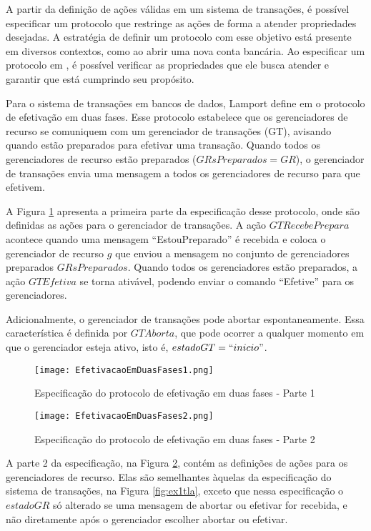 A partir da definição de ações válidas em um sistema de transações, é possível
especificar um protocolo que restringe as ações de forma a atender propriedades
desejadas. A estratégia de definir um protocolo com esse objetivo está presente
em diversos contextos, como ao abrir uma nova conta bancária. Ao especificar um
protocolo em \TLAA, é possível verificar as propriedades que ele busca atender e
garantir que está cumprindo seu propósito.

Para o sistema de transações em bancos de dados, Lamport define em
\cite{video-protocol} o protocolo de efetivação em duas fases. Esse protocolo
estabelece que os gerenciadores de recurso se comuniquem com um gerenciador de
transações (GT), avisando quando estão preparados para efetivar uma transação.
Quando todos os gerenciadores de recurso estão preparados ($GRsPreparados =
GR$), o gerenciador de transações envia uma mensagem a todos os gerenciadores de
recurso para que efetivem.

A Figura \ref{fig:ex3tlap1} apresenta a primeira
parte da especificação desse protocolo, onde são definidas as ações para o
gerenciador de transações. A ação $GTRecebePrepara$ acontece quando uma mensagem
``EstouPreparado'' é recebida e coloca o gerenciador de recurso $g$ que enviou a
mensagem no conjunto de gerenciadores preparados $GRsPreparados$. Quando todos
os gerenciadores estão preparados, a ação $GTEfetiva$ se torna ativável, podendo
enviar o comando ``Efetive'' para os gerenciadores.

Adicionalmente, o gerenciador de transações pode abortar espontaneamente. Essa
característica é definida por $GTAborta$, que pode ocorrer a qualquer momento em
que o gerenciador esteja ativo, isto é, $estadoGT = ``inicio"$.

\begin{figure}[hb]
  \centering
  \texttt{[image: EfetivacaoEmDuasFases1.png]}
  \caption{Especificação do protocolo de efetivação em duas fases - Parte 1}
\label{fig:ex3tlap1}
\end{figure}

\begin{figure}[ht]
  \centering
  \texttt{[image: EfetivacaoEmDuasFases2.png]}
 \caption{Especificação do protocolo de efetivação em duas fases - Parte 2}
\label{fig:ex3tlap2}
\end{figure}

A parte 2 da especificação, na Figura \ref{fig:ex3tlap2}, contém as definições
de ações para os gerenciadores de recurso. Elas são semelhantes àquelas da
especificação do sistema de transações, na Figura \ref{fig:ex1tla}, exceto que
nessa especificação o $estadoGR$ só alterado se uma mensagem de abortar ou
efetivar for recebida, e não diretamente após o gerenciador escolher abortar ou efetivar.

